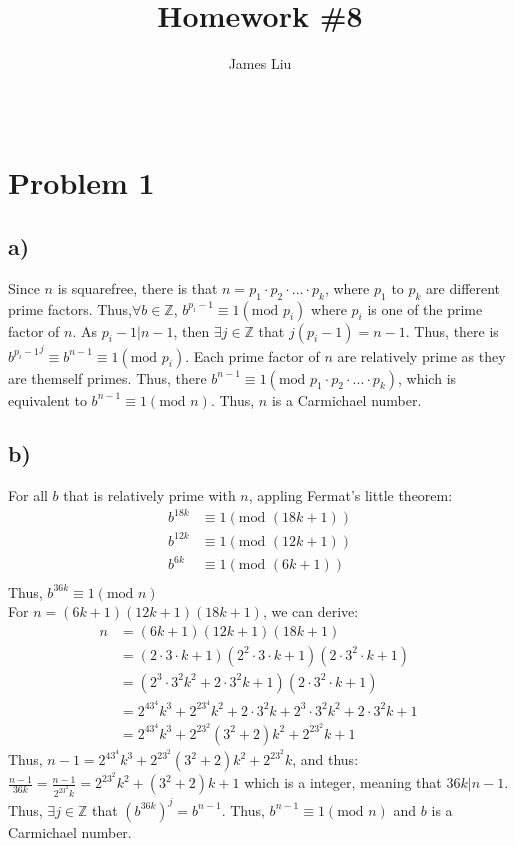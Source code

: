 \documentclass{article}
\title{\textbf{Homework \#8 }}
\author{James Liu}
\date{\ }
\begin{document}
\maketitle

\section*{Problem 1}
\subsection*{a)}
Since \(n\) is squarefree, there is that \(n=p_1\cdot p_2\cdot ... \cdot p_k\), where 
\(p_1\) to \(p_k\) are different prime factors. Thus,\(\forall b \in \mathbb{Z}\), \(b^{p_i-1}\equiv 1 (\text{mod }p_i)\) where \(p_i\) is one
of the prime factor of \(n\). As \(p_i-1|n-1\), then \(\exists j \in \mathbb{Z}\) that \(j(p_i-1)=n-1\). Thus, there is \({b^{p_i-1}}^j\equiv b^{n-1} \equiv 1 (\text{mod }p_i)\).
Each prime factor of \(n\) are relatively prime as they are themself primes. Thus, there \(b^{n-1}\equiv 1 (\text{mod }p_1\cdot p_2 \cdot ... \cdot p_k)\),
 which is equivalent to \(b^{n-1} \equiv 1 (\text{mod }n)\). Thus, \(n\) is a Carmichael number.
\subsection*{b)}
For all \(b\) that is relatively prime with \(n\), appling Fermat's little theorem:
\begin{align*}
    b^{18k}&\equiv 1 (\text{mod }(18k+1))\\
    b^{12k}&\equiv 1 (\text{mod }(12k+1))\\
    b^{6k}&\equiv 1 (\text{mod }(6k+1))\\
\end{align*}
Thus, \(b^{36k}\equiv 1 (\text{mod }n)\)\\
For \(n=(6k+1)(12k+1)(18k+1)\), we can derive:
\begin{align*}
    n&=(6k+1)(12k+1)(18k+1)
    \\  &=(2\cdot3\cdot k+1)(2^2\cdot3\cdot k +1)(2\cdot3^2\cdot k +1)
    \\  &=(2^3\cdot3^2k^2+2\cdot 3^2 k+1)(2\cdot3^2\cdot k +1)
    \\  &=2^43^4k^3+2^23^4k^2+2\cdot3^2 k+2^3\cdot3^2k^2+2\cdot 3^2 k+1\
    \\  &=2^43^4k^3+2^23^2(3^2+2)k^2+2^23^2k+1
\end{align*}
Thus, \(n-1=2^43^4k^3+2^23^2(3^2+2)k^2+2^23^2k\), and thus:\\
\(\displaystyle \frac{n-1}{36k}=\frac{n-1}{2^23^2 k}=2^23^2k^2+(3^2+2)k+1\) which is a integer, meaning that \(36k|n-1\).
Thus, \(\exists j \in \mathbb{Z}\) that \(\left(b^{36k}\right)^j= b^{n-1}\). Thus, \(b^{n-1}\equiv1(\text{mod }n)\) and \(b\) is a 
Carmichael number.
\end{document}
